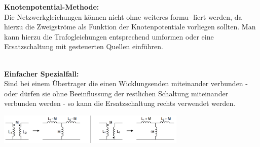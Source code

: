  	\textbf{Knotenpotential-Methode:}\\
	Die Netzwerkgleichungen können nicht ohne weiteres formu- liert werden, da hierzu die Zweigströme als Funktion der Knotenpotentiale vorliegen sollten. Man kann hierzu die Trafogleichungen entsprechend umformen oder eine Ersatzschaltung mit gesteuerten Quellen einführen.\\ \\
	\begin{minipage}{9cm}
		\textbf{Einfacher Spezialfall:}\\
			Sind bei einem Übertrager die einen Wicklungsenden miteinander verbunden - oder dürfen sie ohne Beeinflussung der restlichen Schaltung miteinander verbunden werden - so kann die Ersatzschaltung rechts verwendet werden.
	\end{minipage}
	\begin{minipage}{9cm}
	\includegraphics[width=9cm]{./images/netzwerkanalyse-kopplung-spulen.png}
	\end{minipage}




